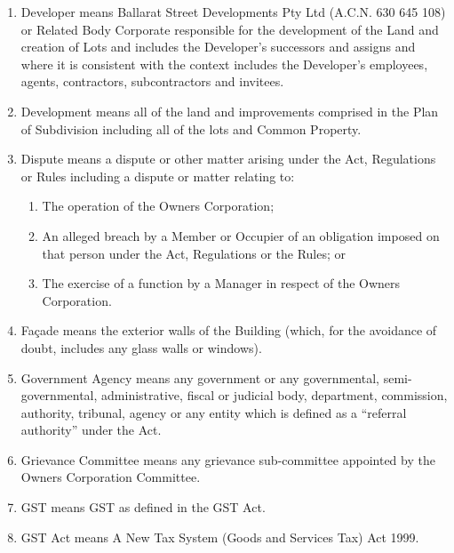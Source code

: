 \documentclass{article}
\begin{document}
\begin{enumerate}[label=\arabic*.]
\begin{enumerate}[label=\arabic{enumi}.\arabic*.]
\begin{enumerate}[label=(\arabic*)]
\item  Developer means Ballarat Street Developments Pty Ltd (A.C.N. 630 645 108) or Related Body Corporate responsible for the development of the Land and creation of Lots and includes the Developer’s successors and assigns and where it is consistent with the context includes the Developer’s employees, agents, contractors, subcontractors and invitees.

\item  Development means all of the land and improvements comprised in the Plan of Subdivision including all of the lots and Common Property.

\item  Dispute means a dispute or other matter arising under the Act, Regulations or Rules including a dispute or matter relating to:

\begin{enumerate}[label=(\alph*)]

\item  The operation of the Owners Corporation;

\item  An alleged breach by a Member or Occupier of an obligation imposed on that person under the Act, Regulations or the Rules; or

\item  The exercise of a function by a Manager in respect of the Owners Corporation.

\end{enumerate}

\item  Façade means the exterior walls of the Building (which, for the avoidance of doubt, includes any glass walls or windows).

\item  Government Agency means any government or any governmental, semi-governmental, administrative, fiscal or judicial body, department, commission, authority, tribunal, agency or any entity which is defined as a “referral authority” under the Act.

\item  Grievance Committee means any grievance sub-committee appointed by the Owners Corporation Committee.

\item  GST means GST as defined in the GST Act.

\item  GST Act means A New Tax System (Goods and Services Tax) Act 1999.


\end{enumerate}
\end{enumerate}
\end{enumerate}
\end{document}
